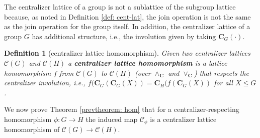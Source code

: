\documentclass[12pt]{amsart}
\newtheorem{definition}[theorem]{Definition}
\begin{document}
The centralizer lattice of a group is not a sublattice of the subgroup lattice because, as noted in Definition \ref{def: cent-lat}, the join operation is not the same as the join operation for the group itself. In addition, the centralizer lattice of a group $G$ has additional structure, i.e., the involution given by taking $\mathbf{C}_G(\cdot)$. 

\begin{definition}[centralizer lattice homomorphism]
    Given two centralizer lattices $\mathcal{C}(G)$ and $\mathcal{C}(H)$ a \textbf{centralizer lattice homomorphism} is a lattice homomorphism $f$ from $\mathcal{C}(G)$ to $\mathcal{C}(H)$ (over $\wedge_\mathbf{C}$ and $\vee_\mathbf{C}$)  that respects the centralizer involution, i.e., $f(\mathbf{C}_G(\mathbf{C}_G(X)) = \mathbf{C}_H(f(\mathbf{C}_G(X))$ for all $X \leq G$. 
\end{definition}


We now prove Theorem \ref{prevtheorem: hom} that for a centralizer-respecting homomorphism $\phi:G\to H$ the induced map $\mathcal{C}_\phi$ is a centralizer lattice homomorphism of $\mathcal{C}(G)\rightarrow \mathcal{C}(H)$. 
\end{document}
